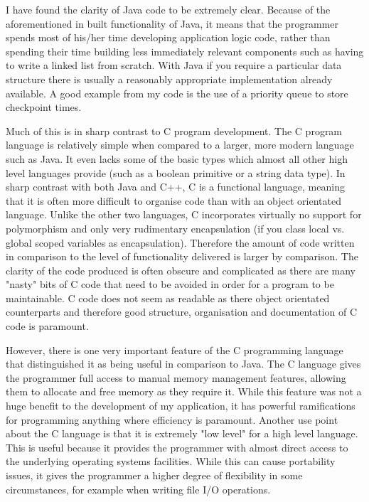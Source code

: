 \documentclass{article}
\begin{document}
I have found the clarity of Java code to be extremely clear. Because of the aforementioned in built functionality of Java, it means that the programmer spends most of his/her time developing application logic code, rather than spending their time building less immediately relevant components such as having to write a linked list from scratch. With Java if you require a particular data structure there is usually a reasonably appropriate implementation already available. A good example from my code is the use of a priority queue to store checkpoint times.

Much of this is in sharp contrast to C program development. The C program language is relatively simple when compared to a larger, more modern language such as Java. It even lacks some of the basic types which almost all other high level languages provide (such as a boolean primitive or a string data type). In sharp contrast with both Java and C++, C is a functional language, meaning that it is often more difficult to organise code than with an object orientated language. Unlike the other two languages, C incorporates virtually no support for polymorphism and only very rudimentary encapsulation (if you class local vs. global scoped variables as encapsulation). Therefore the amount of code written in comparison to the level of functionality delivered is larger by comparison. The clarity of the code produced is often obscure and complicated as there are many "nasty" bits of C code that need to be avoided in order for a program to be maintainable. C code does not seem as readable as there object orientated counterparts and therefore good structure, organisation and documentation of C code is paramount.

However, there is one very important feature of the C programming language that distinguished it as being useful in comparison to Java. The C language gives the programmer full access to manual memory management features, allowing them to allocate and free memory as they require it. While this feature was not a huge benefit to the development of my application, it has powerful ramifications for programming anything where efficiency is paramount. Another use point about the C language is that it is extremely "low level" for a high level language. This is useful because it provides the programmer with almost direct access to the underlying operating systems facilities. While this can cause portability issues, it gives the programmer a higher degree of flexibility in some circumstances, for example when writing file I/O operations.
\end{document}
